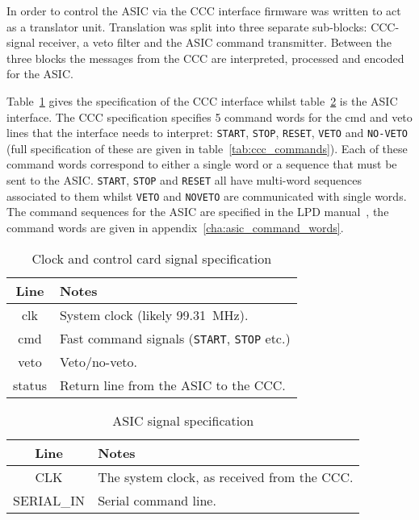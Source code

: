 \documentclass[]{report}
\begin{document}
    In order to control the ASIC via the CCC interface firmware was written to act as a translator unit. Translation was split into three separate sub-blocks: CCC-signal receiver, a veto filter and the ASIC command transmitter. Between the three blocks the messages from the CCC are interpreted, processed and encoded for the ASIC. 
    
    Table~\ref{tab:ccc_spec} gives the specification of the CCC interface whilst table~\ref{tab:asic_spec} is the ASIC interface. The CCC specification specifies 5 command words for the cmd and veto lines that the interface needs to interpret: \texttt{START}, \texttt{STOP}, \texttt{RESET}, \texttt{VETO} and \texttt{NO-VETO} (full specification of these are given in table~\ref{tab:ccc_commands}). Each of these command words correspond to either a single word or a sequence that must be sent to the ASIC. \texttt{START}, \texttt{STOP} and \texttt{RESET} all have multi-word sequences associated to them whilst \texttt{VETO} and \texttt{NOVETO} are communicated with single words. The command sequences for the ASIC are specified in the LPD manual~\cite{lpd_manual}, the command words are given in appendix~\ref{cha:asic_command_words}.
    
    \begin{table}
        \begin{center}
            \begin{tabular}{c|l}
                Line & Notes \\
                \hline
                clk    & System clock (likely 99.31~MHz).        \\
                cmd    & Fast command signals (\texttt{START}, \texttt{STOP} etc.) \\
                veto   & Veto/no-veto.                                             \\
                status & Return line from the ASIC to the CCC.                     \\
            \end{tabular}
        \end{center}
        \caption{Clock and control card signal specification}
        \label{tab:ccc_spec}
    \end{table}

    \begin{table}
        \begin{center}
            \begin{tabular}{c|l}
                Line       & Notes                                       \\
                \hline
                CLK        & The system clock, as received from the CCC. \\
                SERIAL\_IN & Serial command line.                        \\
            \end{tabular}
        \end{center}
        \caption{ASIC signal specification}
        \label{tab:asic_spec}
    \end{table}
  
\end{document}
